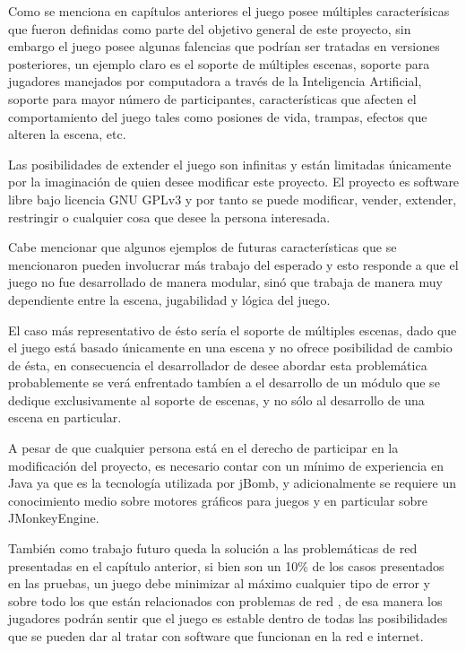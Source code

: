 \documentclass[a4paper,12pt,openany,oneside]{book}
\begin{document}
Como se menciona en capítulos anteriores el juego posee múltiples caracterísicas que fueron definidas como parte del objetivo general de este proyecto, sin embargo el juego posee algunas falencias que podrían ser tratadas en versiones posteriores, un ejemplo claro es el soporte de múltiples escenas, soporte para jugadores manejados por computadora a través de la Inteligencia Artificial, soporte para mayor número de participantes, características que afecten el comportamiento del juego tales como posiones de vida, trampas, efectos que alteren la escena, etc. 

Las posibilidades de extender el juego son infinitas y están limitadas únicamente por la imaginación de quien desee modificar este proyecto. El proyecto es software libre bajo licencia GNU GPLv3 y por tanto se puede modificar, vender, extender, restringir o cualquier cosa que desee la persona interesada.

Cabe mencionar que algunos ejemplos de futuras características que se mencionaron pueden involucrar más trabajo del esperado y esto responde a que el juego no fue desarrollado de manera modular, sinó que trabaja de manera muy dependiente entre la escena, jugabilidad y lógica del juego.

El caso más representativo de ésto sería el soporte de múltiples escenas, dado que el juego está basado únicamente en una escena y no ofrece posibilidad de cambio de ésta, en consecuencia el desarrollador de desee abordar esta problemática probablemente se verá enfrentado tambíen a el desarrollo de un módulo que se dedique exclusivamente al soporte de escenas, y no sólo al desarrollo de una escena en particular.

A pesar de que cualquier persona está en el derecho de participar en la modificación del proyecto, es necesario contar con un mínimo de experiencia en Java ya que es la tecnología utilizada por jBomb, y adicionalmente se requiere un conocimiento medio sobre motores gráficos para juegos y en particular sobre JMonkeyEngine.

También como trabajo futuro queda la solución a las problemáticas de red presentadas en el capítulo anterior, si bien son un 10\% de los casos presentados en las pruebas, un juego debe minimizar al máximo cualquier tipo de error y sobre todo los que están relacionados con problemas de red \cite{VALVE2}, de esa manera los jugadores podrán sentir que el juego es estable dentro de todas las posibilidades que se pueden dar al tratar con software que funcionan en la red e internet.
\end{document}
